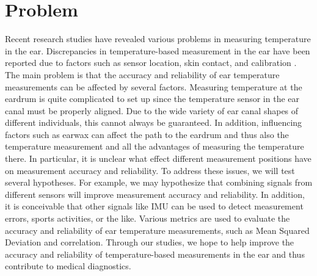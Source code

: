 \section{Problem}
Recent research studies have revealed various problems in measuring temperature in the ear.
Discrepancies in temperature-based measurement in the ear have been reported due to factors such as sensor location, skin contact, and calibration \cite{rohrbergTemperatureMeasurementEar1997, gasimAccuracyTympanicTemperature2013, amoateng-adjepongAccuracyInfraredTympanic1999a, hookerScreeningFeverAdult1996a, cattaneoAccuracyPrecisionBody2000}.
The main problem is that the accuracy and reliability of ear temperature measurements can be affected by several factors. 
Measuring temperature at the eardrum is quite complicated to set up since the temperature sensor in the ear canal must be properly aligned. 
Due to the wide variety of ear canal shapes of different individuals, this cannot always be guaranteed.
In addition, influencing factors such as earwax can affect the path to the eardrum and thus also the temperature measurement and all the advantages of measuring the temperature there.
In particular, it is unclear what effect different measurement positions have on measurement accuracy and reliability.
To address these issues, we will test several hypotheses. 
For example, we may hypothesize that combining signals from different sensors will improve measurement accuracy and reliability.
In addition, it is conceivable that other signals like IMU can be used to detect measurement errors, sports activities, or the like.
Various metrics are used to evaluate the accuracy and reliability of ear temperature measurements, such as Mean Squared Deviation and correlation.
Through our studies, we hope to help improve the accuracy and reliability of temperature-based measurements in the ear and thus contribute to medical diagnostics.

